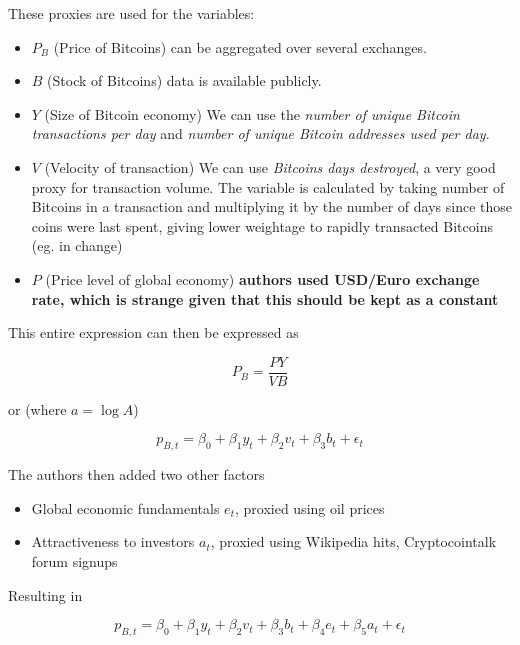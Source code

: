 \documentclass[9pt, compress]{beamer}
\begin{document}
\begin{frame}[fragile]
These proxies are used for the variables:

\begin{itemize}
\item $P_B$ (Price of Bitcoins) can be aggregated over several exchanges. 
\item $B$ (Stock of Bitcoins) data is available publicly.
\item $Y$ (Size of Bitcoin economy) We can use the \emph{number of unique Bitcoin transactions per day} and \emph{number of unique Bitcoin addresses used per day}.
\item $V$ (Velocity of transaction) We can use \emph{Bitcoins days destroyed}, a very good proxy for transaction volume. The variable is calculated by taking number of Bitcoins in a transaction and multiplying it by the number of days since those coins were last spent, giving lower weightage to rapidly transacted Bitcoins (eg. in change)
\item $P$ (Price level of global economy) \textbf{authors used USD/Euro exchange rate, which is strange given that this should be kept as a constant}
\end{itemize}
\end{frame}

\begin{frame}[fragile]
This entire expression can then be expressed as 

\[P_B = \frac{PY}{VB}\]

or (where $a = \log{A}$)

\[p_{B,t} = \beta_0 + \beta_1 y_t + \beta_2 v_t + \beta_3 b_t + \epsilon_t\]

The authors then added two other factors

\begin{itemize}
\item Global economic fundamentals $e_t$, proxied using oil prices
\item Attractiveness to investors $a_t$, proxied using Wikipedia hits, Cryptocointalk forum signups
\end{itemize}

Resulting in

\[p_{B,t} = \beta_0 + \beta_1 y_t + \beta_2 v_t + \beta_3 b_t + \beta_4 e_t + \beta_5 a_t + \epsilon_t\]

\end{frame}
\end{document}
